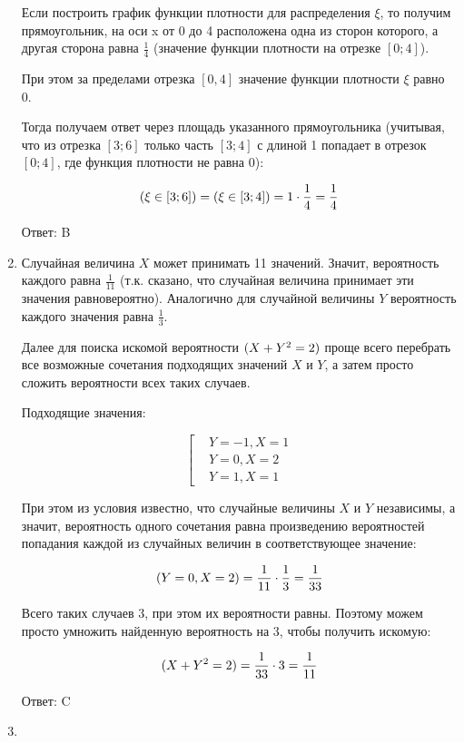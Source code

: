 \documentclass[11pt, a4paper]{article}
\let\P\relax
\DeclareMathOperator{\P}{\mathbb{P}}
\theoremstyle{definition}
\begin{document}
\begin{enumerate}
	Если построить график функции плотности для распределения $\xi$, то получим прямоугольник, на оси x от 0 до 4 расположена одна из сторон которого, а другая сторона равна $\frac{1}{4}$ (значение функции плотности на отрезке $[0;4]$). 
	
	При этом за пределами отрезка $[0,4]$ значение функции плотности $\xi$ равно 0.
	
	Тогда получаем ответ через площадь указанного прямоугольника (учитывая, что из отрезка $[3;6]$ только часть $[3;4]$ с длиной 1 попадает в отрезок $[0;4]$, где функция плотности не равна 0):
	
	\[
	\P(\xi \in [3;6])=\P(\xi \in [3;4])=1\cdot \frac{1}{4}=\frac{1}{4}
	\]
	
	Ответ: B
	
	\item 
	
	Случайная величина $X$ может принимать 11 значений. 
	Значит, вероятность каждого равна $\frac{1}{11}$ (т.к. сказано, что случайная величина принимает эти значения равновероятно). 
	Аналогично для случайной величины $Y$ вероятность каждого значения равна $\frac{1}{3}$.
	
	Далее для поиска искомой вероятности $\P(X+Y^2 = 2)$ проще всего перебрать все возможные сочетания подходящих значений $X$ и $Y$, а затем просто сложить вероятности всех таких случаев. 
	
	Подходящие значения:
	
	\[\left[
	\begin{aligned}
	&Y=-1, X=1\\
	&Y=0, X=2\\
	&Y=1, X=1
	\end{aligned}
	\right.
	\]
	
	При этом из условия известно, что случайные величины $X$ и $Y$ независимы, а значит, вероятность одного сочетания равна произведению вероятностей попадания каждой из случайных величин в соответствующее значение:
	
	\[
	\P(Y=0, X=2)=\frac{1}{11}\cdot \frac{1}{3}=\frac{1}{33}
	\]
	
	Всего таких случаев 3, при этом их вероятности равны. 
	Поэтому можем просто умножить найденную вероятность на 3, чтобы получить искомую:
	
	\[
	\P(X+Y^2 = 2) = \frac{1}{33}\cdot 3=\frac{1}{11}
	\]
	
	Ответ: C	
	
	\item 
	

\end{enumerate}
\end{document}
